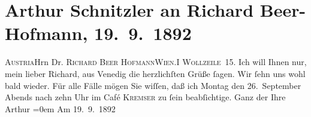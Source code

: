 

         
         \renewcommand{\erwaehntePersonen}{Personen: Richard Beer-Hofmann}
         \renewcommand{\erwaehnteOrte}{Orte: Café Kremser, Theater in der Josefstadt, Venedig, Wien, Wollzeile, Österreich}
         \renewcommand{\erwaehnteWerke}{}
               \section[Arthur Schnitzler an Richard Beer-Hofmann, 19. 9. 1892]{ Arthur Schnitzler an Richard Beer-Hofmann, 19. 9. 1892}\nopagebreak{}\rehead{ }\begin{ledgroupsized}[t]{13cm}\normalsize\beginnumbering \toendnotes[C]{\smallbreak\pagebreak[2]} 
\pstart{}{\pb}\textsc{Austria}\pend{}\pstart{}Hrn Dr. \textsc{Richard Beer Hofmann}\pend{}\pstart{}\textsc{Wien.}\pend{}\pstart{}\textsc{I Wollzeile 15}.\pend{}{\bigskip}\pstart
           \noindent{}{\pb}Ich will Ihnen nur, mein lieber Richard,
               aus Venedig die herzlichſten Grüße
               ſagen. Wir ſehn uns wohl bald wieder. Für alle Fälle mögen Sie wiſſen, {\pb}daß ich Montag den 26. September Abends
               nach zehn Uhr im Café \textsc{Kremser} zu ſein beabſichtige.\pend
           \pstart
           Ganz der Ihre{\\[\baselineskip]}\spacefill\mbox{Arthur}\pend
           \leftskip=0em{}\pstart
           Am 19. 9. 1892\pend
           
         
         \endnumbering{}\end{ledgroupsized}  \newcommand{\dateiname}{L00124}\newcommand{\titel}{Arthur Schnitzler an Richard Beer-Hofmann, 19. 9. 1892}\newcommand{\editorInnen}{Martin Anton Müller und Gerd-Hermann Susen}
      